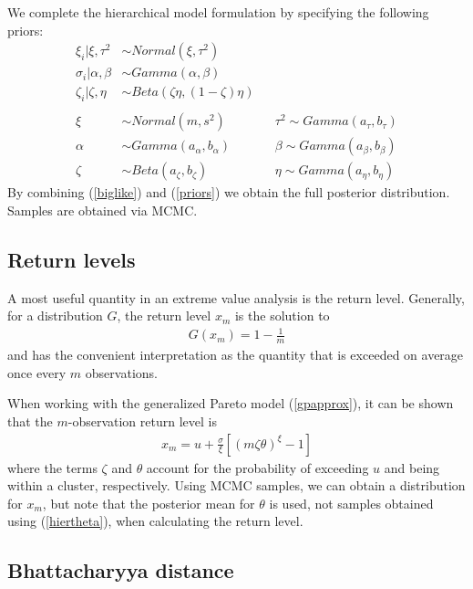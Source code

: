 \documentclass[12pt]{article}
\begin{document}
We complete the hierarchical model formulation by specifying the following priors:
\begin{align}
\xi_i|\xi, \tau^2  &\sim Normal(\xi, \tau^2) \nonumber \\
\sigma_i|\alpha, \beta &\sim Gamma(\alpha, \beta) \nonumber \\
\zeta_i|\zeta, \eta &\sim Beta(\zeta\eta, (1-\zeta)\eta) \nonumber \\
 \label{priors} \\
\xi &\sim Normal(m, s^2)&  &\tau^2 \sim Gamma(a_\tau, b_\tau) \nonumber \\
\alpha &\sim Gamma(a_\alpha, b_\alpha)&  &\beta \sim Gamma(a_\beta, b_\beta) \nonumber \\
\zeta &\sim Beta(a_\zeta, b_\zeta)&  &\eta \sim Gamma(a_\eta, b_\eta) \nonumber
\end{align}
By combining (\ref{biglike}) and (\ref{priors}) we obtain the full posterior distribution. Samples are obtained via MCMC.



\subsection{Return levels}
\label{return}

A most useful quantity in an extreme value analysis is the return level. Generally, for a distribution $G$, the return level $x_m$ is the solution to
\begin{align}
G(x_m) = 1-\frac{1}{m}
\end{align}
and has the convenient interpretation as the quantity that is exceeded on average once every $m$ observations.

When working with the generalized Pareto model (\ref{gpapprox}), it can be shown that the $m$-observation return level is
\begin{align}
x_m = u +\frac{\sigma}{\xi}\left[\left(m\zeta\theta\right)^\xi-1\right] \label{rl}
\end{align}
where the terms $\zeta$ and $\theta$ account for the probability of exceeding $u$ and being within a cluster, respectively. Using MCMC samples, we can obtain a distribution for $x_m$, but note that the posterior mean for $\theta$ is used, not samples obtained using (\ref{hiertheta}), when calculating the return level.


\subsection{Bhattacharyya distance}
\label{bhatta}
\end{document}

